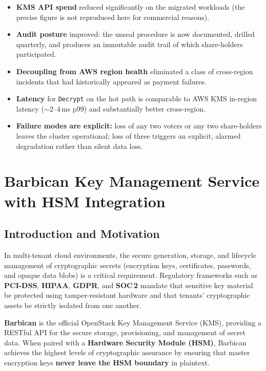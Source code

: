 \documentclass[12pt,a4paper,oneside]{report}
\begin{document}
\begin{itemize}[leftmargin=*]
    \item \textbf{KMS API spend} reduced significantly on the migrated workloads (the precise figure is not reproduced here for commercial reasons).
    \item \textbf{Audit posture} improved: the unseal procedure is now documented, drilled quarterly, and produces an immutable audit trail of which share-holders participated.
    \item \textbf{Decoupling from AWS region health} eliminated a class of cross-region incidents that had historically appeared as payment failures.
    \item \textbf{Latency} for \texttt{Decrypt} on the hot path is comparable to AWS KMS in-region latency ($\sim$2--4\,ms p99) and substantially better cross-region.
    \item \textbf{Failure modes are explicit:} loss of any two voters or any two share-holders leaves the cluster operational; loss of three triggers an explicit, alarmed degradation rather than silent data loss.
\end{itemize}


\chapter[Barbican KMS with HSM]{Barbican Key Management Service with HSM Integration}
\label{chap:barbican}


\section{Introduction and Motivation}

In multi-tenant cloud environments, the secure generation, storage, and lifecycle management of cryptographic secrets (encryption keys, certificates, passwords, and opaque data blobs) is a critical requirement. Regulatory frameworks such as \textbf{PCI-DSS}, \textbf{HIPAA}, \textbf{GDPR}, and \textbf{SOC\,2} mandate that sensitive key material be protected using tamper-resistant hardware and that tenants' cryptographic assets be strictly isolated from one another.

\textbf{Barbican} is the official OpenStack Key Management Service (KMS), providing a RESTful API for the secure storage, provisioning, and management of secret data. When paired with a \textbf{Hardware Security Module (HSM)}, Barbican achieves the highest levels of cryptographic assurance by ensuring that master encryption keys \textbf{never leave the HSM boundary} in plaintext.
\end{document}
